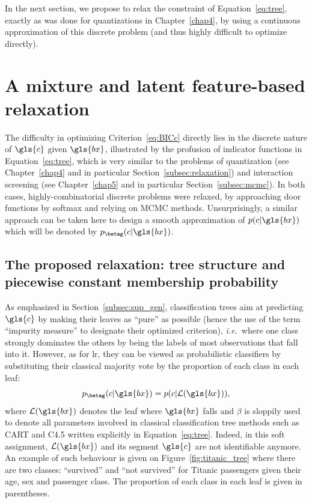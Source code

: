 In the next section, we propose to relax the constraint of Equation~\eqref{eq:tree}, exactly as was done for quantizations in Chapter~\ref{chap4}, by using a continuous approximation of this discrete problem (and thus highly difficult to optimize directly).


\section{A mixture and latent feature-based relaxation}

The difficulty in optimizing Criterion~\eqref{eq:BICc} directly lies in the discrete nature of $\gls{c}$ given $\gls{bx}$, illustrated by the profusion of indicator functions in Equation~\eqref{eq:tree}, which is very similar to the problems of quantization (see Chapter~\ref{chap4} and in particular Section~\ref{subsec:relaxation}) and interaction screening (see Chapter~\ref{chap5} and in particular Section~\ref{subsec:mcmc}). In both cases, highly-combinatorial discrete problems were relaxed, by approaching door functions by softmax and relying on MCMC methods. Unsurprisingly, a similar approach can be taken here to design a smooth approximation of $p(c | \gls{bx})$ which will be denoted by $p_{\betag}(c | \gls{bx})$.

\subsection{The proposed relaxation: tree structure and piecewise constant membership probability} \label{subsec:relax_tree}

As emphasized in Section~\ref{subsec:sup_gen}, classification trees aim at predicting $\gls{c}$ by making their leaves as ``pure'' as possible (hence the use of the term ``impurity measure'' to designate their optimized criterion), \textit{i.e.}\ where one class strongly dominates the others by being the labels of most observations that fall into it. However, as for \gls{lr}, they can be viewed as probabilistic classifiers by substituting their classical majority vote by the proportion of each class in each leaf:
\begin{equation} \label{eq:tree_leaf}
p_{\betag}(c | \gls{bx}) = p(c | \mathcal{L}(\gls{bx})),
\end{equation}
where $\mathcal{L}(\gls{bx})$ denotes the leaf where $\gls{bx}$ falls and $\beta$ is sloppily used to denote all parameters involved in classical classification tree methods such as CART and C4.5 written explicitly in Equation~\eqref{eq:tree}. Indeed, in this soft assignment, $\mathcal{L}(\gls{bx})$ and its segment $\gls{c}$ are not identifiable anymore. An example of such behaviour is given on Figure~\ref{fig:titanic_tree} where there are two classes: ``survived'' and ``not survived'' for Titanic passengers given their age, sex and passenger class. The proportion of each class in each leaf is given in parentheses.

